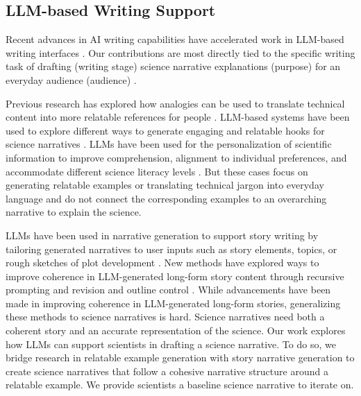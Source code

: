 



\subsection{LLM-based Writing Support}
Recent advances in AI writing capabilities have accelerated work in LLM-based writing interfaces \cite{biermann2022tool, buschek2021impact, shakeri2021saga, sommers1980revision, lee2024design}. Our contributions are most directly tied to the specific writing task of drafting (writing stage) science narrative explanations (purpose) for an everyday audience (audience) \cite{lee2024design}.

Previous research has explored how analogies can be used to translate technical content into more relatable references for people \cite{august2020writing, kim2024authors, nguyen2024simulating, hullman2018improving}. LLM-based systems have been used to explore different ways to generate engaging and relatable hooks for science narratives \cite{long2023tweetorialhooksgenerativeai, 10.1145/3643834.3661587}. LLMs have been used for the personalization of scientific information to improve comprehension, alignment to individual preferences, and accommodate different science literacy levels \cite{august2023paper, das2023balancing, ding2023fluid}. But these cases focus on generating relatable examples or translating technical jargon into everyday language and do not connect the corresponding examples to an overarching narrative to explain the science. 

LLMs have been used in narrative generation to support story writing by tailoring generated narratives to user inputs such as story elements, topics, or rough sketches of plot development \cite{calderwood2022spinning, belz2024story, park2023designing, rashkin2020plotmachines}. New methods have explored ways to improve coherence in LLM-generated long-form story content through recursive prompting and revision and outline control \cite{yang2022re3, yang2022doc, wang2023improving}. While advancements have been made in improving coherence in LLM-generated long-form stories, generalizing these methods to science narratives is hard. Science narratives need both a coherent story and an accurate representation of the science. Our work explores how LLMs can support scientists in drafting a science narrative. To do so, we bridge research in relatable example generation with story narrative generation to create science narratives that follow a cohesive narrative structure around a relatable example. We provide scientists a baseline science narrative to iterate on. 

